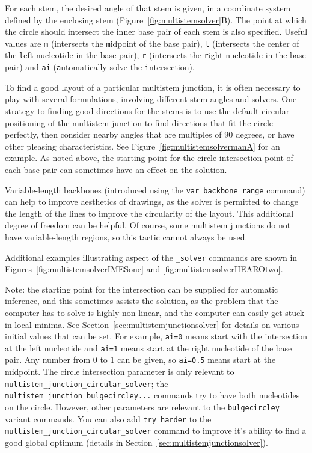 \documentclass[letterpaper,12pt]{report}
\begin{document}
For each stem, the desired angle of that stem is given, in a coordinate system defined
by the enclosing stem (Figure~\ref{fig:multistemsolver}B).
The point at which the circle should intersect the inner base pair of each stem is also specified.
Useful values are {\tt m} (intersects the {\tt m}idpoint of the base pair),
{\tt l} (intersects the center of the {\tt l}eft nucleotide in the base pair),
{\tt r} (intersects the {\tt r}ight nucleotide in the base pair)
and {\tt ai} ({\tt a}utomatically solve the {\tt i}ntersection).

To find a good layout of a particular multistem junction, it is often
necessary to play with several formulations,
involving different stem angles and solvers.
One strategy to finding good directions for the stems is to use the default circular positioning of the multistem junction
to find directions that fit the circle perfectly, then consider nearby angles that are multiples of 90 degrees, or have
other pleasing characteristics.
See Figure~\ref{fig:multistemsolvermanA} for an example.
As noted above, the starting point for the circle-intersection point of each base pair can sometimes
have an effect on the solution.

Variable-length backbones (introduced using the {\tt var\_backbone\_range} command) can help to improve aesthetics of drawings, as the solver is permitted
to change the length of the lines to improve the circularity of the layout.  This additional degree of freedom can be helpful.
Of course, some multistem junctions do not have variable-length regions, so this tactic cannot always be used.

Additional examples illustrating aspect of the {\tt \_solver} commands are shown in Figures~\ref{fig:multistemsolverIMESone} and \ref{fig:multistemsolverHEAROtwo}.


Note: the starting point for the intersection can be supplied for automatic inference,
and this sometimes assists the solution, as the problem that the computer has to solve is
highly non-linear, and the computer can easily get stuck in local minima.
See Section~\ref{sec:multistemjunctionsolver} for details on various initial
values that can be set.
For example, {\tt ai=0} means start with the intersection at the left nucleotide and {\tt ai=1} means start at the
right nucleotide of the base pair.  Any number from 0 to 1 can be given, so {\tt ai=0.5} means start at the midpoint.  
The circle intersection parameter is only relevant to {\tt multistem\_junction\_circular\_solver}; the {\tt multistem\_junction\_bulgecircley...} commands try to have both
nucleotides on the circle.  However, other parameters are relevant to the
{\tt bulgecircley} variant commands.
You can also add {\tt try\_harder} to the {\tt multistem\_junction\_circular\_solver} command
to improve it's ability to find a good global optimum (details in 
Section~\ref{sec:multistemjunctionsolver}).
\end{document}
